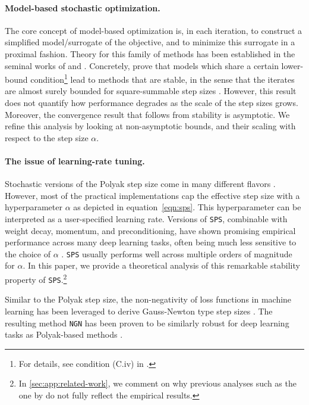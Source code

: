 \documentclass{article}
\newcommand{\SPS}{{\texttt{SPS}}}
\newcommand{\NGN}{{\texttt{NGN}}}
\theoremstyle{plain}
\theoremstyle{definition}
\theoremstyle{remark}
\begin{document}
\paragraph{Model-based stochastic optimization.} The core concept of model-based optimization is, in each iteration, to construct a simplified model/surrogate of the objective, and to minimize this surrogate in a proximal fashion. Theory for this family of methods has been established in the seminal works of \citet{Asi2019} and \citet{Davis2019}. Concretely, \citet{Asi2019,Asi2019a} prove that models which share a certain lower-bound condition\footnote{For details, see condition (C.iv) in \citet{Asi2019}.} lead to methods that are stable, in the sense that the iterates are almost surely bounded for square-summable step sizes \citep[Cor.\ 3.5]{Asi2019}. However, this result does not quantify how performance degrades as the scale of the step sizes grows. Moreover, the convergence result that follows from stability \citep[Prop.\ 3.8]{Asi2019} is asymptotic. We refine this analysis by looking at non-asymptotic bounds, and their scaling with respect to the step size $\alpha$.
\paragraph{The issue of learning-rate tuning.} Stochastic versions of the Polyak step size come in many different flavors \citep{Berrada2019,Loizou2021,Gower2022}. However, most of the practical implementations cap the effective step size with a hyperparameter $\alpha$ as depicted in equation~\eqref{eqn:sps}. This hyperparameter can be interpreted as a user-specified learning rate. Versions of \SPS{}, combinable with weight decay, momentum, and preconditioning, have shown promising empirical performance across many deep learning tasks, often being much less sensitive to the choice of $\alpha$ \citep{Schaipp2023,Schaipp2024a}. \SPS{} usually performs well across multiple orders of magnitude for $\alpha$. In this paper, we provide a theoretical analysis of this remarkable stability property of \SPS{}.\footnote{In \cref{sec:app:related-work}, we comment on why previous analyses such as the one by \citet{Loizou2021} do not fully reflect the empirical results.}

Similar to the Polyak step size, the non-negativity of loss functions in machine learning has been leveraged to derive Gauss-Newton type step sizes \citep{Orvieto2024,Islamov2025}. The resulting method \NGN{} has been proven to be similarly robust for deep learning tasks as Polyak-based methods \citep{Islamov2025}.
\end{document}
